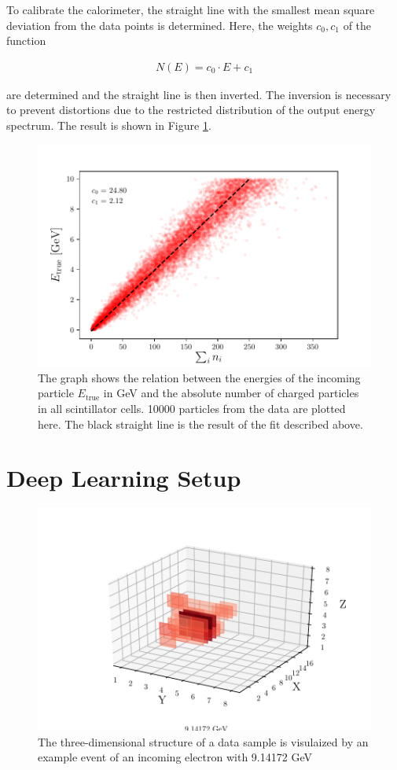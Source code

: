 \documentclass[12pt, a4paper]{thesis}
\begin{document}
To calibrate the calorimeter, the straight line with the smallest mean
square deviation from the data points is determined. Here, the weights
\(c_0, c_1\) of the function

\begin{align}
N(E) = c_0 \cdot E + c_1
\end{align}

are determined and the straight line is then inverted. The inversion
is necessary to prevent distortions due to the restricted distribution
of the output energy spectrum. The result is shown in Figure
\ref{e-vs-sum_n_fit}.


\begin{figure}[H]
\centering
\includegraphics[width=.9\linewidth]{../images/e-vs-sum_n_fit.pdf}
\caption{ The graph shows the relation between the energies of the
  incoming particle \(E_{\text{true}}\) in GeV and the absolute number
  of charged particles in all scintillator cells.  10000 particles
  from the data are plotted here. The black straight line is the
  result of the fit described above.}
\label{e-vs-sum_n_fit}
\end{figure}

\section{Deep Learning Setup}
\label{sec:orgb3e1899}

\begin{figure}[H]
  \centering
  \includegraphics[width=.9\linewidth]{../images/data_display.pdf}
  \caption{The three-dimensional structure of a data sample is
    visulaized by an example event of an incoming electron with
    9.14172 GeV}
  \label{data_display}
\end{figure}
\end{document}
